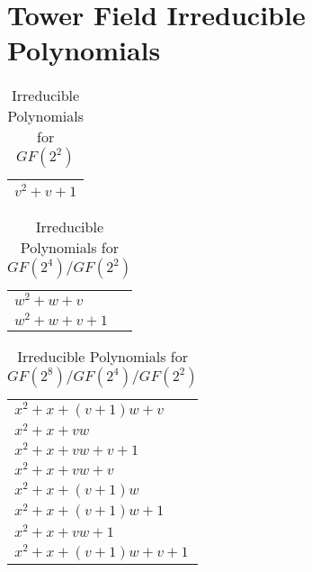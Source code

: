 \section{Tower Field Irreducible Polynomials}
\begin{center}
\begin{longtable}{|l|}
\caption[Irreducible Polynomials for $GF(2^2)$]{Irreducible Polynomials for $GF(2^2)$}\\
\hline
	$v^2 + v + 1$ \\
\hline
\end{longtable}
\end{center}

\begin{center}
\begin{longtable}{|l|}
\caption[Irreducible Polynomials for $GF(2^4)/GF(2^2)$]{Irreducible Polynomials for $GF(2^4)/GF(2^2)$}\\
\hline
	$w^2 + w + v$ \\
	$w^2 + w + v + 1$ \\
\hline
\end{longtable}
\end{center}

\begin{center}
\begin{longtable}{|l|}
\caption[Irreducible Polynomials for $GF(2^8)/GF(2^4)/GF(2^2)$]{Irreducible Polynomials for $GF(2^8)/GF(2^4)/GF(2^2)$}\\
\hline
	$x^2 + x + (v + 1)w + v$ \\
	$x^2 + x + vw$ \\
	$x^2 + x + vw + v + 1$ \\
	$x^2 + x + vw + v$ \\
	$x^2 + x + (v + 1)w$ \\
	$x^2 + x + (v + 1)w + 1$ \\
	$x^2 + x + vw + 1$ \\
	$x^2 + x + (v + 1)w + v + 1$ \\
\hline
\end{longtable}
\end{center}

